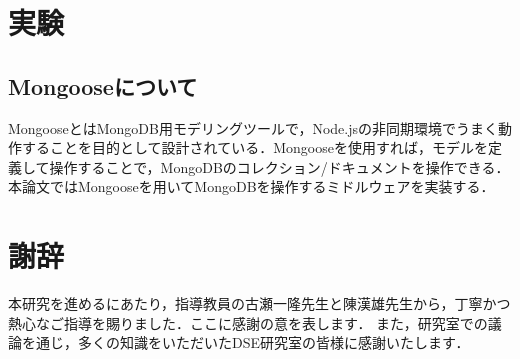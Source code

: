 \documentclass[a4paper,11pt]{ujreport}
\begin{document}
\chapter{実験}
\section{Mongooseについて}
MongooseとはMongoDB用モデリングツールで，Node.jsの非同期環境でうまく動作することを目的として設計されている．Mongooseを使用すれば，モデルを定義して操作することで，MongoDBのコレクション/ドキュメントを操作できる\cite{mongoose}．本論文ではMongooseを用いてMongoDBを操作するミドルウェアを実装する．





\chapter*{謝辞}
本研究を進めるにあたり，指導教員の古瀬一隆先生と陳漢雄先生から，丁寧かつ熱心なご指導を賜りました．ここに感謝の意を表します．
また，研究室での議論を通じ，多くの知識をいただいたDSE研究室の皆様に感謝いたします．

\newpage

\renewcommand{\bibname}{参考文献}



\end{document}
